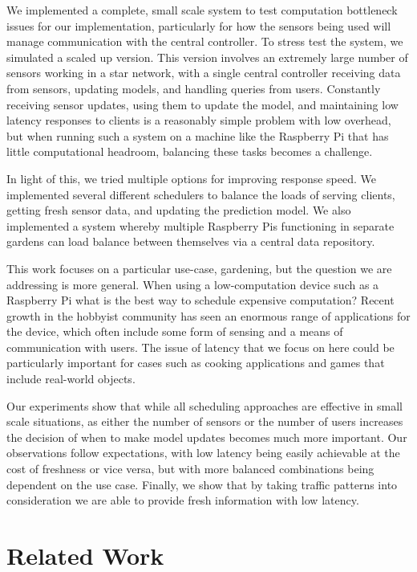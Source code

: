 \documentclass[a4paper]{acm_proc_article-sp}
\begin{document}
We implemented a complete, small scale system to test computation bottleneck issues for our implementation, particularly for how the sensors being used will manage communication with the central controller. To stress test the system, we simulated a scaled up version. This version involves an extremely large number of sensors working in a star network, with a single central controller receiving data from sensors, updating models, and handling queries from users.  Constantly receiving sensor updates, using them to update the model, and maintaining low latency responses to clients is a reasonably simple problem with low overhead, but when running such a system on a machine like the Raspberry Pi that has little computational headroom, balancing these tasks becomes a challenge.

In light of this, we tried multiple options for improving response speed.  We implemented several different schedulers to balance the loads of serving clients, getting fresh sensor data, and updating the prediction model.  We also implemented a system whereby multiple Raspberry Pis functioning in separate gardens can load balance between themselves via a central data repository.

This work focuses on a particular use-case, gardening, but the question we are addressing is more general.  When using a low-computation device such as a Raspberry Pi what is the best way to schedule expensive computation?  Recent growth in the hobbyist community has seen an enormous range of applications for the device, which often include some form of sensing and a means of communication with users.  The issue of latency that we focus on here could be particularly important for cases such as cooking applications and games that include real-world objects.

Our experiments show that while all scheduling approaches are effective in small scale situations, as either the number of sensors or the number of users increases the decision of when to make model updates becomes much more important.  Our observations follow expectations, with low latency being easily achievable at the cost of freshness or vice versa, but with more balanced combinations being dependent on the use case.  Finally, we show that by taking traffic patterns into consideration we are able to provide fresh information with low latency.

\section{Related Work}
\end{document}
